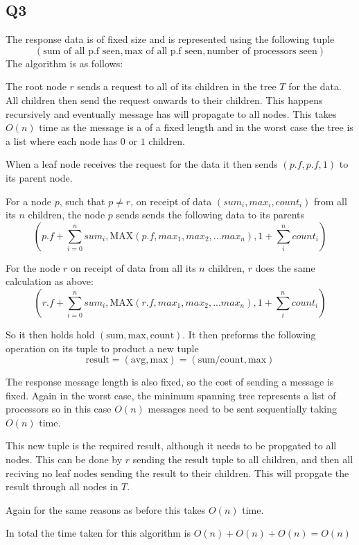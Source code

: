\documentclass[11pt]{article}
\begin{document}
\subsection*{Q3}

The response data is of fixed size and is represented using the following tuple
$$
(\text{sum of all p.f seen}, \text{max of all p.f seen}, \text{number of processors seen})
$$
The algorithm is as follows:

The root node $r$ sends a request to all of its children in the tree $T$ for the data. All children then send the request onwards to their children. This happens recursively and eventually  message has will propagate to all nodes. This takes $O(n)$ time as the message is a of a fixed length and in the worst case the tree is a list where each node has $0$ or $1$ children.

When a leaf node receives the request for the data it then sends $(p.f, p.f, 1)$ to its parent node.

For a node $p$, such that $p \neq r$, on receipt of data $(sum_i, max_i, count_i)$ from all its $n$ children, the node $p$ sends sends the following data to its parents 
$$
(p.f + \sum_{i=0}^n  sum_i, \text{MAX}(p.f, max_1, max_2, ... max_n), 1 + \sum_i^n count_i)
$$

For the node $r$ on receipt of data from all its $n$ children, $r$ does the same calculation as above:
$$
(r.f + \sum_{i=0}^n  sum_i, \text{MAX}(r.f, max_1, max_2, ... max_n), 1 + \sum_i^n count_i)
$$

So it then holds hold $(\text{sum}, \text{max}, \text{count})$.  It then preforms the following operation on its tuple to product a new tuple 
$$\text{result} = (\text{avg}, \text{max}) = (\text{sum/count}, \text{max})$$

The response message length is also fixed, so the cost of sending a message is fixed.
Again in the worst case, the minimum spanning tree represents a list of processors so in this case $O(n)$ messages need to be sent sequentially taking $O(n)$ time.

This new tuple is the required result, although it needs to be propgated to all nodes. This can be done by $r$ sending the result tuple to all children, and then all reciving no leaf nodes sending the result to their children. This will propgate the result through all nodes in $T$.

Again for the same reasons as before this takes $O(n)$ time.

In total the time taken for this algorithm is $O(n) + O(n) + O(n) = O(n)$
\end{document}
